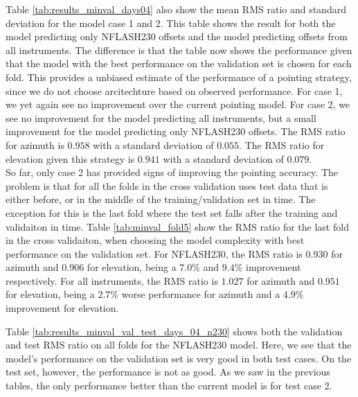 Table \ref{tab:results_minval_days04} also show the mean RMS ratio and standard deviation for the model case 1 and 2.
This table shows the result for both the model predicting only NFLASH230 offsets and the model predicting offsets from all instruments.
The difference is that the table now shows the performance given that the model with the best performance on the validation set is chosen for each fold.
This provides a unbiased estimate of the performance of a pointing strategy, since we do not choose arcitechture based on observed performance.
For case 1, we yet again see no improvement over the current pointing model. For case 2, we see no improvement for the model predicting all instruments,
but a small improvement for the model predicting only NFLASH230 offsets. The RMS ratio for azimuth is $0.958$ with a standard deviation of $0.055$.
The RMS ratio for elevation given this strategy is $0.941$ with a standard deviation of $0.079$.\\

So far, only case 2 has provided signs of improving the pointing accuracy.
The problem is that for all the folds in the cross validation uses test data that is either before, or in the middle of the training/validation set in time.
The exception for this is the last fold where the test set falls after the training and validaiton in time.
Table \ref{tab:minval_fold5} show the RMS ratio for the last fold in the cross validaiton,
when choosing the model complexity with best performance on the validation set.
For NFLASH230, the RMS ratio is $0.930$ for azimuth and $0.906$ for elevation, being a $7.0\%$ and $9.4\%$ improvement respectively.
For all instruments, the RMS ratio is $1.027$ for azimuth and $0.951$ for elevation, being a $2.7\%$ worse performance for azimuth and a $4.9\%$ improvement for elevation.

Table \ref{tab:results_minval_val_test_days_04_n230} shows both the validation and test RMS ratio on all folds for the NFLASH230 model.
Here, we see that the model's performance on the validation set is very good in both test cases.
On the test set, however, the performance is not as good. As we saw in the previous tables,
the only performance better than the current model is for test case 2.


